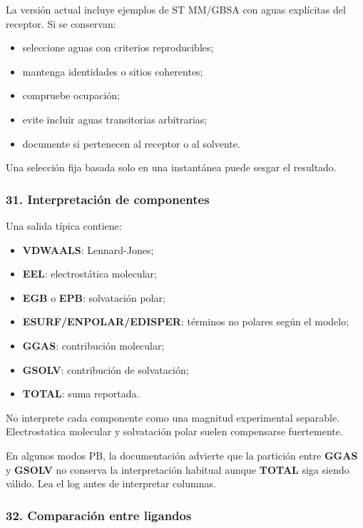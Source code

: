 \documentclass[
  spanish,
  11pt,
  a4paper]{article}
\providecommand{\tightlist}{%
  \setlength{\itemsep}{0pt}\setlength{\parskip}{0pt}}
\begin{document}
La versión actual incluye ejemplos de ST MM/GBSA con aguas explícitas
del receptor. Si se conservan:

\begin{itemize}
\tightlist
\item
  seleccione aguas con criterios reproducibles;
\item
  mantenga identidades o sitios coherentes;
\item
  compruebe ocupación;
\item
  evite incluir aguas transitorias arbitrarias;
\item
  documente si pertenecen al receptor o al solvente.
\end{itemize}

Una selección fija basada solo en una instantánea puede sesgar el
resultado.

\subsubsection{31. Interpretación de
componentes}\label{interpretaciuxf3n-de-componentes}

Una salida típica contiene:

\begin{itemize}
\tightlist
\item
  \textbf{VDWAALS}: Lennard-Jones;
\item
  \textbf{EEL}: electrostática molecular;
\item
  \textbf{EGB} o \textbf{EPB}: solvatación polar;
\item
  \textbf{ESURF/ENPOLAR/EDISPER}: términos no polares según el modelo;
\item
  \textbf{GGAS}: contribución molecular;
\item
  \textbf{GSOLV}: contribución de solvatación;
\item
  \textbf{TOTAL}: suma reportada.
\end{itemize}

No interprete cada componente como una magnitud experimental separable.
Electrostatica molecular y solvatación polar suelen compensarse
fuertemente.

En algunos modos PB, la documentación advierte que la partición entre
\textbf{GGAS} y \textbf{GSOLV} no conserva la interpretación habitual
aunque \textbf{TOTAL} siga siendo válido. Lea el log antes de
interpretar columnas.

\subsubsection{32. Comparación entre
ligandos}\label{comparaciuxf3n-entre-ligandos}
\end{document}

